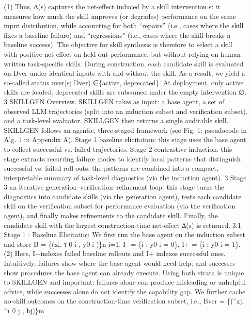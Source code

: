 (1)
Thus, ∆(s) captures the net-effect induced by a skill intervention s: it measures how much the skill
improves (or degrades) performance on the same input distribution, while accounting for both “repairs”
(i.e., cases where the skill fixes a baseline failure) and “regressions” (i.e., cases where the skill breaks
a baseline success). The objective for skill synthesis is therefore to select a skill with positive
net-effect on held-out performance, but without relying on human-written task-specific skills. During
construction, each candidate skill is evaluated on Dver under identical inputs with and without the
skill. As a result, we yield a so-called status σver(s; Dver) ∈\{active, deprecated\}. At deployment,
only active skills are loaded; deprecated skills are subsumed under the empty intervention ∅.
3
SKILLGEN
Overview. SKILLGEN takes as input: a base agent, a set of observed LLM trajectories (split into
an induction subset and verification subset), and a task-level evaluator. SKILLGEN then returns a
single auditable skill. SKILLGEN follows an agentic, three-staged framework (see Fig. 1; pseudocode
in Alg. 1 in Appendix A). Stage
1 baseline elicitation: this stage uses the base agent to collect
successful vs. failed trajectories. Stage 2 contrastive induction: this stage extracts recurring failure
modes to identify local patterns that distinguish successful vs. failed roll-outs; the patterns are
combined into a compact, interpretable summary of task-level diagnostics (via the induction agent).
3
Stage 3 an iterative generation–verification–refinement loop: this stage turns the diagnostics into
candidate skills (via the generation agent), tests each candidate skill on the verification subset for
performance evaluation (via the verification agent), and finally makes refinements to the candidate
skill. Finally, the candidate skill with the largest construction-time net-effect ∆(s) is returned.
3.1
Stage 1 : Baseline Elicitation
We first run the base agent on the induction subset and store
B = \{(xi, τ 0
i , y0
i )\}n
i=1,
I−= \{i : y0
i = 0\},
I+ = \{i : y0
i = 1\}.
(2)
Here, I−indexes failed baseline rollouts and I+ indexes successful ones. Intuitively, failures
show where the base agent would need help; and successes show procedures the base agent can
already execute. Using both strata is unique to SKILLGEN and important: failures alone can produce
misleading or unhelpful advice, while successes alone do not identify the capability gap.
We further cache no-skill outcomes on the construction-time verification subset, i.e.,
Bver = \{(˜xj, ˜τ 0
j , bj)\}m
